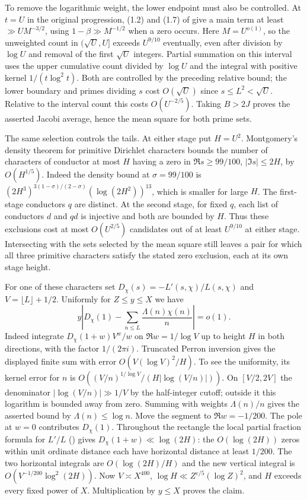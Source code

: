 \documentclass[11pt]{amsart}
\theoremstyle{definition}
\theoremstyle{remark}
\begin{document}
To remove the logarithmic weight, the lower endpoint must also be
controlled. At $t=U$ in the original progression, (1.2) and (1.7)
of \cite{ThornerZaman} give a main term at least
$\gg U M^{-3/2}$, using $1-\beta\gg M^{-1/2}$ when a zero
occurs. Here $M=U^{o(1)}$, so the unweighted count in
$(\sqrt U,U]$ exceeds $U^{9/10}$ eventually, even after division
by $\log U$ and removal of the first $\sqrt U$ integers.
Partial summation on this interval uses the upper cumulative
count divided by $\log U$ and the integral with positive kernel
$1/(t\log^2 t)$. Both are controlled by the preceding relative
bound; the lower boundary and primes dividing $s$ cost
$O(\sqrt U)$ since $s\le L^2<\sqrt U$. Relative to the interval
count this costs $O(U^{-2/5})$. Taking $B>2J$ proves the asserted
Jacobi average, hence the mean square for both prime sets.

The same selection controls the tails. At either stage put $H=U^2$.
Montgomery's density theorem for primitive Dirichlet characters
\cite[Chapter~12]{MontDensity} bounds the number of characters of
conductor at most $H$ having a zero in $\Re s\ge 99/100$,
$|\Im s|\le 2H$, by $O(H^{1/5})$. Indeed the density bound at
$\sigma=99/100$ is
$(2H^3)^{3(1-\sigma)/(2-\sigma)}(\log(2H^2))^{13}$,
which is smaller for large $H$. The first-stage conductors $q$
are distinct. At the second stage, for fixed $q$, each list of
conductors $d$ and $qd$ is injective and both are bounded by $H$.
Thus these exclusions cost at most $O(U^{2/5})$ candidates out
of at least $U^{9/10}$ at either stage. Intersecting with the
sets selected by the mean square still leaves a pair for which
all three primitive characters satisfy the stated zero exclusion,
each at its own stage height.

For one of these characters set $D_\chi(s)=-L'(s,\chi)/L(s,\chi)$
and $V=\lfloor L\rfloor+1/2$. Uniformly for $Z\le y\le X$ we have
\[
 y\left|D_\chi(1)-\sum_{n\le L}\frac{\Lambda(n)\chi(n)}n\right|=o(1).
\]
Indeed integrate $D_\chi(1+w)V^w/w$ on $\Re w=1/\log V$ up to
height $H$ in both directions, with the factor $1/(2\pi i)$.
Truncated Perron inversion gives the displayed finite sum with
error $O(V(\log V)^2/H)$. To see the uniformity, its kernel
error for $n$ is $O((V/n)^{1/\log V}/(H|\log(V/n)|))$.
On $[V/2,2V]$ the denominator $|\log(V/n)|\gg1/V$
by the half-integer cutoff; outside it this logarithm is bounded
away from zero. Summing with weights $\Lambda(n)/n$ gives
the asserted bound by $\Lambda(n)\le\log n$.
Move the segment to $\Re w=-1/200$. The pole at $w=0$ contributes
$D_\chi(1)$. Throughout the rectangle the local partial fraction
formula for $L'/L$ (\cite{IK}) gives $D_\chi(1+w)\ll\log(2H)$:
the $O(\log(2H))$ zeros within unit ordinate distance each have
horizontal distance at least $1/200$. The two horizontal integrals
are $O(\log(2H)/H)$ and the new vertical integral is
$O(V^{-1/200}\log^2(2H))$. Now $V\asymp X^{400}$,
$\log H\ll Z^{\varepsilon/5}(\log Z)^2$, and $H$ exceeds every
fixed power of $X$. Multiplication by $y\le X$ proves the claim.
\end{document}

